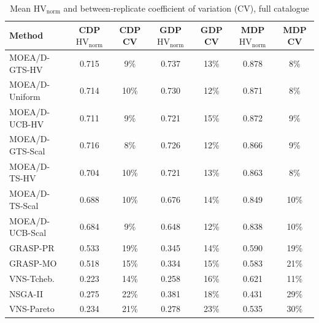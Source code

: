 \begin{table}[t]
\centering
\footnotesize
\setlength{\tabcolsep}{4pt}
\caption{Mean $\mathrm{HV}_{\mathrm{norm}}$ and between-replicate coefficient of variation (CV), full catalogue}\label{tab:2}
\begin{tabular}{lcccccc}
\toprule
Method & CDP $\mathrm{HV}_{\mathrm{norm}}$ & CDP CV & GDP $\mathrm{HV}_{\mathrm{norm}}$ & GDP CV & MDP $\mathrm{HV}_{\mathrm{norm}}$ & MDP CV \\
\midrule
MOEA/D-GTS-HV & 0.715 & 9\% & 0.737 & 13\% & 0.878 & 8\% \\
MOEA/D-Uniform & 0.714 & 10\% & 0.730 & 12\% & 0.871 & 8\% \\
MOEA/D-UCB-HV & 0.711 & 9\% & 0.721 & 15\% & 0.872 & 9\% \\
MOEA/D-GTS-Scal & 0.716 & 8\% & 0.726 & 12\% & 0.866 & 9\% \\
MOEA/D-TS-HV & 0.704 & 10\% & 0.721 & 13\% & 0.863 & 8\% \\
MOEA/D-TS-Scal & 0.688 & 10\% & 0.676 & 14\% & 0.849 & 10\% \\
MOEA/D-UCB-Scal & 0.684 & 9\% & 0.648 & 12\% & 0.838 & 10\% \\
GRASP-PR & 0.533 & 19\% & 0.345 & 14\% & 0.590 & 19\% \\
GRASP-MO & 0.518 & 15\% & 0.334 & 15\% & 0.583 & 21\% \\
VNS-Tcheb. & 0.223 & 14\% & 0.258 & 16\% & 0.621 & 11\% \\
NSGA-II & 0.275 & 22\% & 0.381 & 18\% & 0.431 & 29\% \\
VNS-Pareto & 0.234 & 21\% & 0.278 & 23\% & 0.535 & 30\% \\
\bottomrule
\end{tabular}
\end{table}

